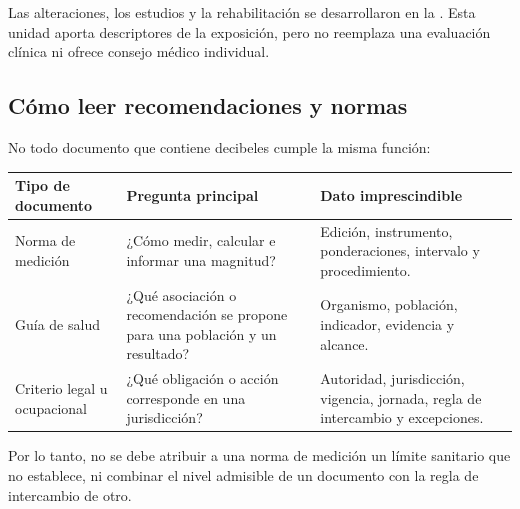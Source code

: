 

Las alteraciones, los estudios y la rehabilitación se desarrollaron en la
. Esta unidad aporta descriptores de la exposición,
pero no reemplaza una evaluación clínica ni ofrece consejo médico individual.

\subsection{Cómo leer recomendaciones y normas}
\label{sec:u10-normativa}

No todo documento que contiene decibeles cumple la misma función:
\begin{center}
\begin{tabular}{|
    >{\raggedright\arraybackslash}p{}|
    >{\raggedright\arraybackslash}p{}|
    >{\raggedright\arraybackslash}p{}|}
    \hline
    \textbf{Tipo de documento} & \textbf{Pregunta principal} &
    \textbf{Dato imprescindible} \\
    \hline
    Norma de medición & ¿Cómo medir, calcular e informar una magnitud? &
    Edición, instrumento, ponderaciones, intervalo y procedimiento. \\
    \hline
    Guía de salud & ¿Qué asociación o recomendación se propone para una
    población y un resultado? &
    Organismo, población, indicador, evidencia y alcance. \\
    \hline
    Criterio legal u ocupacional & ¿Qué obligación o acción corresponde en
    una jurisdicción? &
    Autoridad, jurisdicción, vigencia, jornada, regla de intercambio y
    excepciones. \\
    \hline
\end{tabular}
\end{center}

Por lo tanto, no se debe atribuir a una norma de medición un límite sanitario
que no establece, ni combinar el nivel admisible de un documento con la regla
de intercambio de otro.

